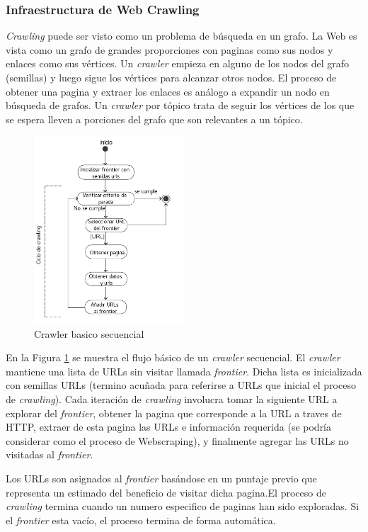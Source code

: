 \subsubsection{Infraestructura de Web Crawling}
\emph{Crawling} puede ser visto como un problema de búsqueda en un grafo. La Web es vista como un grafo de grandes proporciones con paginas como sus nodos y enlaces como sus vértices. Un \emph{crawler} empieza en alguno de los nodos del grafo (semillas) y luego sigue los vértices para alcanzar otros nodos. El proceso de obtener una pagina y extraer los enlaces es análogo a expandir un nodo en búsqueda de grafos. Un \emph{crawler} por tópico trata de seguir los vértices de los que se espera lleven a porciones del grafo que son relevantes a un tópico.\cite{crawlingwebPant} 

\begin{figure}[!htbp]
    \centering
    \includegraphics[width=0.5\textwidth]{Figuras/basic_sequential_crawler.png}
    \caption{Crawler basico secuencial}
    \label{fig:basiccrawler}
\end{figure}


En la Figura \ref{fig:basiccrawler} se muestra el flujo básico de un \emph {crawler} secuencial. El \emph{crawler} mantiene una lista de URLs sin visitar llamada \emph{frontier}. Dicha lista es inicializada con semillas URLs (termino acuñada para referirse a URLs que inicial el proceso de \emph{crawling}). Cada iteración de \emph{crawling} involucra tomar la siguiente URL a explorar del \emph{frontier}, obtener la pagina que corresponde a la URL a traves de HTTP, extraer de esta pagina las URLs e información requerida (se podría considerar como el proceso de Webscraping), y finalmente agregar las URLs no visitadas al \emph{frontier}.

Los URLs son asignados al \emph{frontier} basándose en un puntaje previo que representa un estimado del beneficio de visitar dicha pagina.El proceso de \emph{crawling} termina cuando un numero especifico de paginas han sido exploradas. Si el \emph{frontier} esta vacío, el proceso termina de forma automática.\cite{crawlingwebPant} 